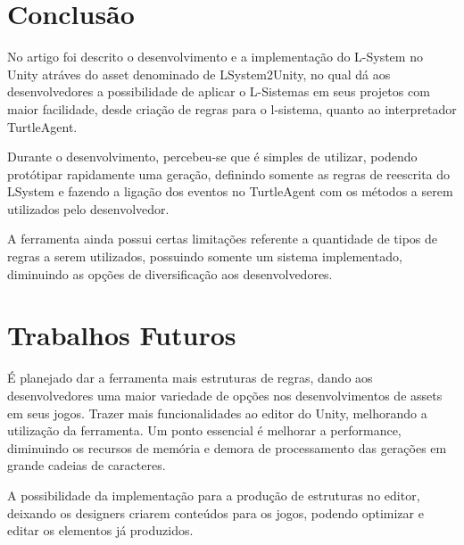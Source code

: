 \section{Conclusão}
No artigo foi descrito o desenvolvimento e a implementação do L-System no Unity atráves do asset denominado de LSystem2Unity, no qual dá aos desenvolvedores a possibilidade de aplicar o L-Sistemas em seus projetos com maior facilidade, desde criação de regras para o l-sistema, quanto ao interpretador TurtleAgent.

Durante o desenvolvimento, percebeu-se que é simples de utilizar, podendo protótipar rapidamente uma geração, definindo somente as regras de reescrita do LSystem e fazendo a ligação dos eventos no TurtleAgent com os métodos a serem utilizados pelo desenvolvedor.

A ferramenta ainda possui certas limitações referente a quantidade de tipos de regras a serem utilizados, possuindo somente um sistema implementado, diminuindo as opções de diversificação aos desenvolvedores.

\section{Trabalhos Futuros}
É planejado dar a ferramenta mais estruturas de regras, dando aos desenvolvedores uma maior variedade de opções nos desenvolvimentos de assets em seus jogos. Trazer mais funcionalidades ao editor do Unity, melhorando a utilização da ferramenta. Um ponto essencial é melhorar a performance, diminuindo os recursos de memória e demora de processamento das gerações em grande cadeias de caracteres.

A possibilidade da implementação para a produção de estruturas no editor, deixando os designers criarem conteúdos para os jogos, podendo optimizar e editar os elementos já produzidos.